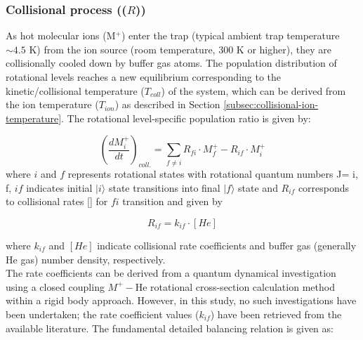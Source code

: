 \subsubsection{Collisional process (\texorpdfstring{($R$)}{R})}
\label{subsec:ROSAA-simulation-coll}

As hot molecular ions (M$^+$) enter the trap (typical ambient trap temperature $\sim 4.5$ K) from the ion source (room temperature, 300 K or higher), they are collisionally cooled down by buffer gas atoms. The population distribution of rotational levels reaches a new equilibrium corresponding to the kinetic/collisional temperature ($T_{coll}$) of the system, which can be derived from the ion temperature ($T_{ion}$) as described in Section \ref{subsec:collisional-ion-temperature}. The rotational level-specific population ratio is given by:

\begin{equation}
    \left( \frac{dM^+_i}{dt} \right) _{coll.} = \sum_{f \neq i} R_{fi} \cdot M^+_f - R_{if} \cdot M^+_i
    \label{eqn:sim:coll}
\end{equation}
where $i$ and $f$ represents rotational states with rotational quantum numbers J= i, f, $if$ indicates initial $|i\rangle$ state transitions into final $|f\rangle$ state and $R_{if}$ corresponds to collisional rates [\pers] for $fi$ transition and given by 

\[ R_{if}=k_{if} \cdot [He] \]

where $k_{if}$ and $[He]$ indicate collisional rate coefficients and buffer gas (generally He gas) number density, respectively.\\

The rate coefficients can be derived from a quantum dynamical investigation using a closed coupling $M^+-$He rotational cross-section calculation method within a rigid body approach. However, in this study, no such investigations have been undertaken; the rate coefficient values ($k_{if}$) have been retrieved from the available literature. The fundamental detailed balancing relation is given as:

